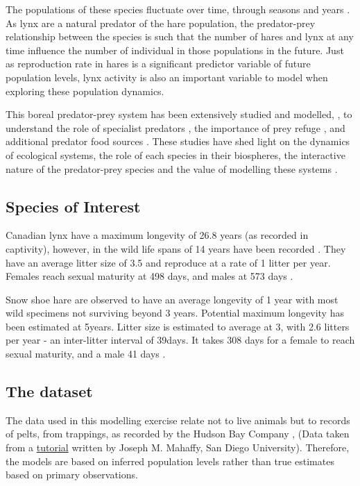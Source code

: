\documentclass{article}
\begin{document}
The populations of these species fluctuate over time, through seasons and years \parencite{maclulich_place_1957}. As lynx are a natural predator of the hare population, the predator-prey relationship between the species is such that the number of hares and lynx at any time influence the number of individual in those populations in the future. Just as reproduction rate in hares is a significant predictor variable of future population levels, lynx activity is also an important variable to model when exploring these population dynamics. 

This boreal predator-prey system has been extensively studied and modelled, \parencite{vik_interlinking_2008}, to understand the role of specialist predators \parencite{lin_spreading_2011, tyson_modelling_2010}, the importance of prey refuge \parencite{sih_prey_1987}, and additional predator food sources \parencite{chakraborty_interactive_2017}. These studies have shed light on the dynamics of ecological systems, the role of each species in their biospheres, the interactive nature of the predator-prey species and the value of modelling these systems \parencite{vik_interlinking_2008}.

\subsection{Species of Interest}
Canadian lynx have a maximum longevity of 26.8 years (as recorded in captivity), however, in the wild life spans of 14 years have been recorded \parencite{nowak_walkers_1999}. They have an average litter size of 3.5 and reproduce at a rate of 1 litter per year. Females reach sexual maturity at  498 days, and males at 573 days \parencite{tacutu_human_2018}. 

Snow shoe hare are observed to have an average longevity of 1 year with most wild specimens not surviving beyond 3 years. Potential maximum longevity has been estimated at 5years. Litter size is estimated to average at 3, with 2.6 litters per year - an inter-litter interval of 39days\parencite{nowak_walkers_1999}. It takes 308 days for a female to reach sexual maturity, and a male 41 days \parencite{tacutu_human_2018}. 

\subsection{The dataset}
The data used in this modelling exercise relate not to live animals but to records of pelts, from trappings, as recorded by the Hudson Bay Company \parencite{maclulich_place_1957}, (Data taken from a \href{https://jmahaffy.sdsu.edu/courses/f09/math636/lectures/lotka/qualde2.html}{tutorial} written by Joseph M. Mahaffy, San Diego University). Therefore, the models are based on inferred population levels rather than true estimates based on primary observations. 
\end{document}
